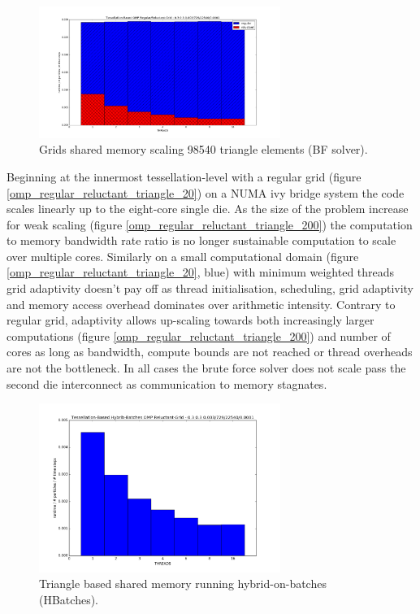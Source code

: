 \documentclass[times,12pt]{article}
\begin{document}
\begin{figure}[htb]
  \begin{center}
    \includegraphics[width=0.7\textwidth]{experiments/omp/omp_mesh_regular-reluctant_200.png}
  \end{center}
  \caption{Grids shared memory scaling 98540 triangle elements (BF solver).}
  \label{figure:omp_regular_reluctant_triangle_200}
\end{figure}


Beginning at the innermost tessellation-level with a regular grid (figure \ref{omp_regular_reluctant_triangle_20}) on a NUMA ivy bridge system the code scales linearly up to the eight-core single die. As the size of the problem increase for weak scaling (figure \ref{omp_regular_reluctant_triangle_200}) the computation to memory bandwidth rate ratio is no longer sustainable computation to scale over multiple cores. Similarly on a small computational domain (figure \ref{omp_regular_reluctant_triangle_20}, blue) with minimum weighted threads grid adaptivity doesn't pay off as thread initialisation, scheduling, grid adaptivity and memory access overhead dominates over arithmetic intensity. Contrary to regular grid, adaptivity allows up-scaling towards both increasingly larger computations (figure \ref{omp_regular_reluctant_triangle_200}) and number of cores as long as bandwidth, compute bounds are not reached or thread overheads are not the bottleneck. In all cases the brute force solver does not scale pass the second die interconnect as communication to memory stagnates.

\begin{figure}[htb]
  \begin{center}
    \includegraphics[width=0.7\textwidth]{experiments/omp/hbatches_omp_triangles_200.png}
  \end{center}
  \caption{Triangle based shared memory running hybrid-on-batches (HBatches).}
  \label{figure:hbatches_triangles_triangle_omp}
\end{figure}
\end{document}
